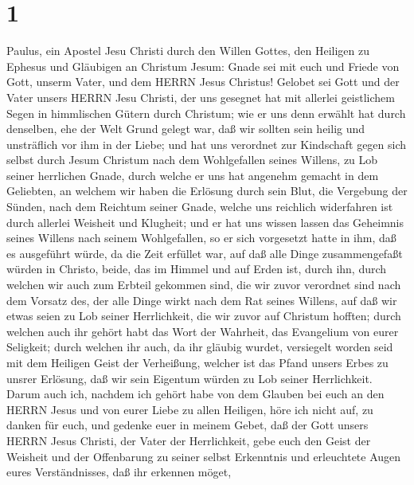 \hypertarget{section}{%
\section{1}\label{section}}

 Paulus, ein Apostel Jesu Christi durch den Willen Gottes,
den Heiligen zu Ephesus und Gläubigen an Christum Jesum: 
Gnade sei mit euch und Friede von Gott, unserm Vater, und dem HERRN
Jesus Christus!  Gelobet sei Gott und der Vater unsers HERRN
Jesu Christi, der uns gesegnet hat mit allerlei geistlichem Segen in
himmlischen Gütern durch Christum;  wie er uns denn erwählt
hat durch denselben, ehe der Welt Grund gelegt war, daß wir sollten sein
heilig und unsträflich vor ihm in der Liebe;  und hat uns
verordnet zur Kindschaft gegen sich selbst durch Jesum Christum nach dem
Wohlgefallen seines Willens,  zu Lob seiner herrlichen
Gnade, durch welche er uns hat angenehm gemacht in dem Geliebten,
 an welchem wir haben die Erlösung durch sein Blut, die
Vergebung der Sünden, nach dem Reichtum seiner Gnade, 
welche uns reichlich widerfahren ist durch allerlei Weisheit und
Klugheit;  und er hat uns wissen lassen das Geheimnis seines
Willens nach seinem Wohlgefallen, so er sich vorgesetzt hatte in ihm,
 daß es ausgeführt würde, da die Zeit erfüllet war, auf daß
alle Dinge zusammengefaßt würden in Christo, beide, das im Himmel und
auf Erden ist, durch ihn,  durch welchen wir auch zum
Erbteil gekommen sind, die wir zuvor verordnet sind nach dem Vorsatz
des, der alle Dinge wirkt nach dem Rat seines Willens,  auf
daß wir etwas seien zu Lob seiner Herrlichkeit, die wir zuvor auf
Christum hofften;  durch welchen auch ihr gehört habt das
Wort der Wahrheit, das Evangelium von eurer Seligkeit; durch welchen ihr
auch, da ihr gläubig wurdet, versiegelt worden seid mit dem Heiligen
Geist der Verheißung,  welcher ist das Pfand unsers Erbes
zu unsrer Erlösung, daß wir sein Eigentum würden zu Lob seiner
Herrlichkeit.  Darum auch ich, nachdem ich gehört habe von
dem Glauben bei euch an den HERRN Jesus und von eurer Liebe zu allen
Heiligen,  höre ich nicht auf, zu danken für euch, und
gedenke euer in meinem Gebet,  daß der Gott unsers HERRN
Jesus Christi, der Vater der Herrlichkeit, gebe euch den Geist der
Weisheit und der Offenbarung zu seiner selbst Erkenntnis 
und erleuchtete Augen eures Verständnisses, daß ihr erkennen möget,
